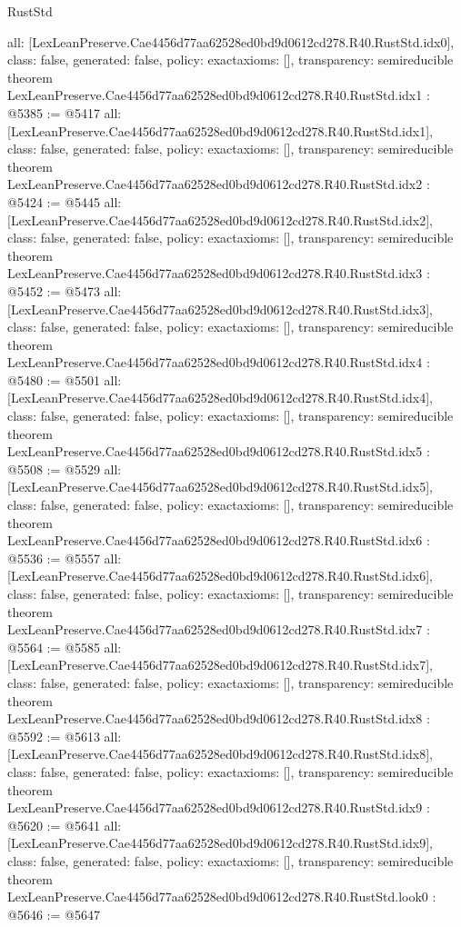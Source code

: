 \begin{lexlean}{RustStd}
\begin{coremodule}
{  all: [LexLeanPreserve.Cae4456d77aa62528ed0bd9d0612cd278.R40.RustStd.idx0],
  class: false,
  generated: false,
  policy: exact{axioms: []},
  transparency: semireducible
}
theorem LexLeanPreserve.Cae4456d77aa62528ed0bd9d0612cd278.R40.RustStd.idx1 : @5385 := @5417 {
  all: [LexLeanPreserve.Cae4456d77aa62528ed0bd9d0612cd278.R40.RustStd.idx1],
  class: false,
  generated: false,
  policy: exact{axioms: []},
  transparency: semireducible
}
theorem LexLeanPreserve.Cae4456d77aa62528ed0bd9d0612cd278.R40.RustStd.idx2 : @5424 := @5445 {
  all: [LexLeanPreserve.Cae4456d77aa62528ed0bd9d0612cd278.R40.RustStd.idx2],
  class: false,
  generated: false,
  policy: exact{axioms: []},
  transparency: semireducible
}
theorem LexLeanPreserve.Cae4456d77aa62528ed0bd9d0612cd278.R40.RustStd.idx3 : @5452 := @5473 {
  all: [LexLeanPreserve.Cae4456d77aa62528ed0bd9d0612cd278.R40.RustStd.idx3],
  class: false,
  generated: false,
  policy: exact{axioms: []},
  transparency: semireducible
}
theorem LexLeanPreserve.Cae4456d77aa62528ed0bd9d0612cd278.R40.RustStd.idx4 : @5480 := @5501 {
  all: [LexLeanPreserve.Cae4456d77aa62528ed0bd9d0612cd278.R40.RustStd.idx4],
  class: false,
  generated: false,
  policy: exact{axioms: []},
  transparency: semireducible
}
theorem LexLeanPreserve.Cae4456d77aa62528ed0bd9d0612cd278.R40.RustStd.idx5 : @5508 := @5529 {
  all: [LexLeanPreserve.Cae4456d77aa62528ed0bd9d0612cd278.R40.RustStd.idx5],
  class: false,
  generated: false,
  policy: exact{axioms: []},
  transparency: semireducible
}
theorem LexLeanPreserve.Cae4456d77aa62528ed0bd9d0612cd278.R40.RustStd.idx6 : @5536 := @5557 {
  all: [LexLeanPreserve.Cae4456d77aa62528ed0bd9d0612cd278.R40.RustStd.idx6],
  class: false,
  generated: false,
  policy: exact{axioms: []},
  transparency: semireducible
}
theorem LexLeanPreserve.Cae4456d77aa62528ed0bd9d0612cd278.R40.RustStd.idx7 : @5564 := @5585 {
  all: [LexLeanPreserve.Cae4456d77aa62528ed0bd9d0612cd278.R40.RustStd.idx7],
  class: false,
  generated: false,
  policy: exact{axioms: []},
  transparency: semireducible
}
theorem LexLeanPreserve.Cae4456d77aa62528ed0bd9d0612cd278.R40.RustStd.idx8 : @5592 := @5613 {
  all: [LexLeanPreserve.Cae4456d77aa62528ed0bd9d0612cd278.R40.RustStd.idx8],
  class: false,
  generated: false,
  policy: exact{axioms: []},
  transparency: semireducible
}
theorem LexLeanPreserve.Cae4456d77aa62528ed0bd9d0612cd278.R40.RustStd.idx9 : @5620 := @5641 {
  all: [LexLeanPreserve.Cae4456d77aa62528ed0bd9d0612cd278.R40.RustStd.idx9],
  class: false,
  generated: false,
  policy: exact{axioms: []},
  transparency: semireducible
}
theorem LexLeanPreserve.Cae4456d77aa62528ed0bd9d0612cd278.R40.RustStd.look0 : @5646 := @5647 {
}
\end{coremodule}
\end{lexlean}
